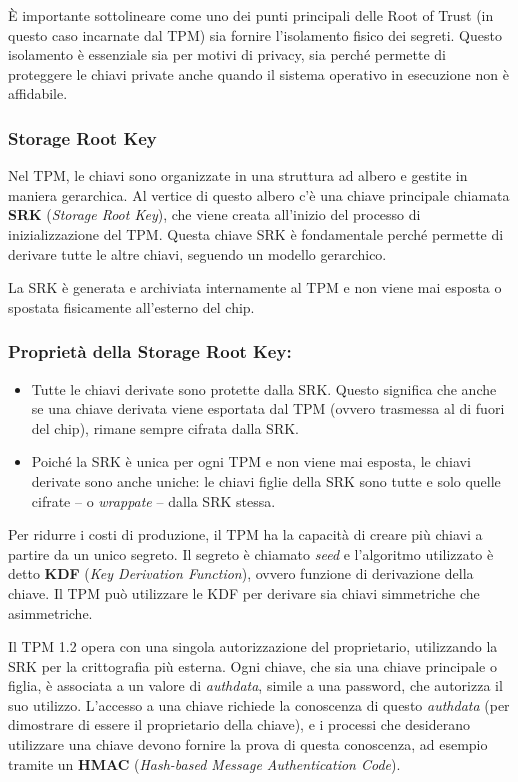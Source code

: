 È importante sottolineare come uno dei punti principali delle Root of Trust (in questo caso incarnate dal TPM) sia fornire l’isolamento fisico dei segreti. Questo isolamento è essenziale sia per motivi di privacy, sia perché permette di proteggere le chiavi private anche quando il sistema operativo in esecuzione non è affidabile.

\subsubsection{Storage Root Key}
Nel TPM, le chiavi sono organizzate in una struttura ad albero e gestite in maniera gerarchica. Al vertice di questo albero c'è una chiave principale chiamata \textbf{SRK} (\textit{Storage Root Key}), che viene creata all'inizio del processo di inizializzazione del TPM. Questa chiave SRK è fondamentale perché permette di derivare tutte le altre chiavi, seguendo un modello gerarchico.

La SRK è generata e archiviata internamente al TPM e non viene mai esposta o spostata fisicamente all'esterno del chip.

\subsubsection*{Proprietà della Storage Root Key:}
\begin{itemize}
    \item Tutte le chiavi derivate sono protette dalla SRK. Questo significa che anche se una chiave derivata viene esportata dal TPM (ovvero trasmessa al di fuori del chip), rimane sempre cifrata dalla SRK.
    \item Poiché la SRK è unica per ogni TPM e non viene mai esposta, le chiavi derivate sono anche uniche: le chiavi figlie della SRK sono tutte e solo quelle cifrate -- o \textit{wrappate} -- dalla SRK stessa. 
\end{itemize}

Per ridurre i costi di produzione, il TPM ha la capacità di creare più chiavi a partire da un unico segreto. Il segreto è chiamato \textit{seed} e l'algoritmo utilizzato è detto \textbf{KDF} (\textit{Key Derivation Function}), ovvero funzione di derivazione della chiave. Il TPM può utilizzare le KDF per derivare sia chiavi simmetriche che asimmetriche.

Il TPM 1.2 opera con una singola autorizzazione del proprietario, utilizzando la SRK per la crittografia più esterna. Ogni chiave, che sia una chiave principale o figlia, è associata a un valore di \textit{authdata}, simile a una password, che autorizza il suo utilizzo. L'accesso a una chiave richiede la conoscenza di questo \textit{authdata} (per dimostrare di essere il proprietario della chiave), e i processi che desiderano utilizzare una chiave devono fornire la prova di questa conoscenza, ad esempio tramite un \textbf{HMAC} (\textit{Hash-based Message Authentication Code}). 

